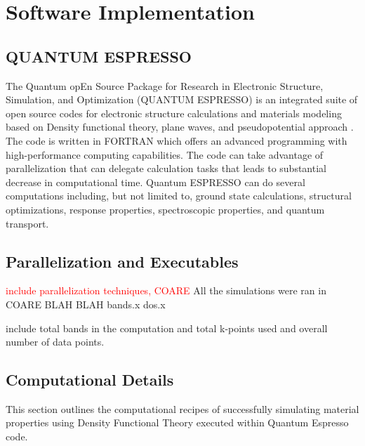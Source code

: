 \chapter{Software Implementation} \label{chap:software}
    \section{QUANTUM ESPRESSO}
    The Quantum opEn  Source  Package  for  Research  in  Electronic  Structure, Simulation, and Optimization (QUANTUM ESPRESSO) is an integrated suite of open source codes for electronic structure calculations and materials modeling based on Density functional theory, plane waves, and pseudopotential approach \citep{Giannozzi2009,Giannozzi2017}. The code is written in FORTRAN which offers an advanced programming with high-performance computing capabilities. The code can take advantage of parallelization that can delegate calculation tasks that leads to substantial decrease in computational time. Quantum ESPRESSO can do several computations including, but not limited to, ground state calculations, structural optimizations, response properties, spectroscopic properties, and quantum transport. 
    
    \section{Parallelization and Executables}
    \textcolor{red}{include parallelization techniques, COARE 
    }
    All the simulations were ran in COARE BLAH BLAH
    bands.x dos.x 

    include total bands in the computation and total k-points used and overall number of data points. 
    \section{Computational Details}
    This section outlines the computational recipes of successfully simulating material properties using Density Functional Theory executed within  Quantum Espresso code. 

